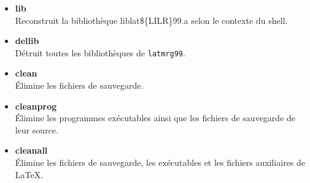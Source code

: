 \documentclass[11pt]{article}
\begin{document}
\begin{itemize}
\item{\bf lib} \\
Reconstruit la biblioth\`eque liblat\$\{LILR\}99.a %
selon le contexte du shell.

\item{\bf dellib} \\
D\'etruit toutes les biblioth\`eques de {\tt latmrg99}.

\item{\bf clean} \\
\'Elimine les fichiers de sauvegarde.

\item{\bf cleanprog} \\
\'Elimine les programmes ex\'ecutables ainsi que les 
fichiers de sauvegarde  de leur source.

\item{\bf cleanall} \\
\'Elimine les fichiers de sauvegarde, les ex\'ecutables et les 
fichiers auxiliaires de {\LaTeX}.

\end{itemize}
\end{document}
